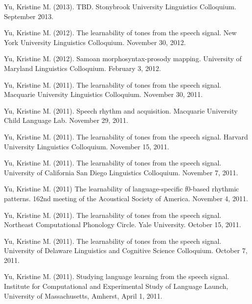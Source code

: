 \documentclass[10pt]{article}
\begin{document}
\begin{bibenum}

    \item Yu, Kristine M. (2013). TBD. Stonybrook University
      Linguistics Colloquium. September 2013.

    \item Yu, Kristine M. (2012). The learnability of tones from the
      speech signal. New York University Linguistics Colloquium. November 30, 2012. 

    \item Yu, Kristine M. (2012). Samoan morphosyntax-prosody
      mapping. University of Maryland Linguistics Colloquium. February
      3, 2012.

    \item Yu, Kristine M. (2011). The learnability of tones from the
      speech signal. Macquarie University Linguistics
      Colloquium. November 30, 2011.  

    \item Yu, Kristine M. (2011). Speech rhythm and
      acquisition. Macquarie University Child Language Lab. November 29, 2011. 

    \item Yu, Kristine M. (2011). The learnability of tones from the
      speech signal. Harvard University Linguistics
      Colloquium. November 15, 2011.

    \item Yu, Kristine M. (2011). The learnability of tones from the
      speech signal. University of California San Diego Linguistics
      Colloquium. November 7, 2011. 

    \item Yu, Kristine M. (2011) The learnability of language-specific
      f0-based rhythmic patterns. 162nd meeting of the Acoustical
      Society of America. November 4, 2011. 

    \item Yu, Kristine M. (2011). The learnability of tones from the
      speech signal. Northeast Computational Phonology Circle. Yale
      University. October 15, 2011.   

    \item Yu, Kristine M. (2011). The learnability of tones from the
      speech signal. University of Delaware Linguistics and Cognitive
      Science Colloquium. October 7, 2011. 

    \item Yu, Kristine M. (2011). Studying language learning from the
      speech signal. Institute for Computational and Experimental
      Study of Language Launch, University of Massachusetts, Amherst, April 1, 2011.


\end{bibenum}
\end{document}

